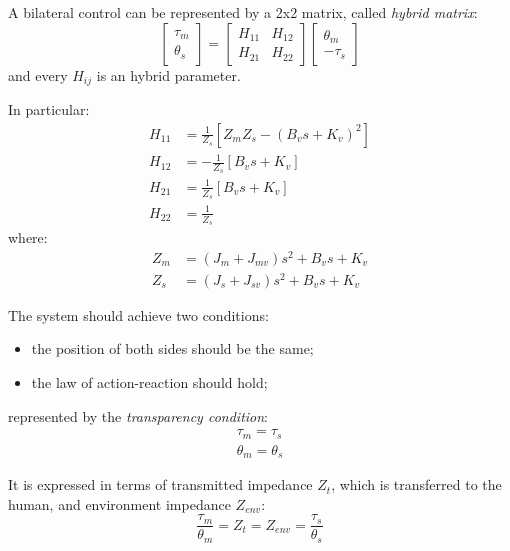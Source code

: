 A bilateral control can be represented by a 2x2 matrix, called \emph{hybrid matrix}:
\begin{equation}
	\begin{bmatrix}
	\tau_m \\ \theta_s
	\end{bmatrix} = 
	\begin{bmatrix}
	H_{11} & H_{12} \\
	H_{21} & H_{22}
	\end{bmatrix}
	\begin{bmatrix}
	\theta_m \\ - \tau_s
	\end{bmatrix}
	\label{hybrid_matrix}
\end{equation}
and every $ H_{ij} $ is an hybrid parameter.

In particular:
\begin{align}
	H_{11} &= \frac{1}{Z_s}[Z_m Z_s - (B_v s + K_v)^2] \\
	H_{12} &= -\frac{1}{Z_s}[B_v s + K_v] \\
	H_{21} &= \frac{1}{Z_s}[B_v s + K_v] \\
	H_{22} &= \frac{1}{Z_s} 
\end{align}
where:
\begin{align}
	Z_m &= (J_m + J_{mv}) s^2 + B_v s + K_v \\
	Z_s &= (J_s + J_{sv}) s^2 + B_v s + K_v
\end{align}

The system should achieve two conditions:
\begin{itemize}
	\item the position of both sides should be the same;
	\item the law of action-reaction should hold;
\end{itemize}
represented by the \emph{transparency condition}:
\begin{align}
	\tau_m = \tau_s \\
	\theta_m = \theta_s
\end{align}

It is expressed in terms of transmitted impedance $ Z_t $, which is transferred to the human, and environment impedance $ Z_{env} $:
\begin{equation}
	\frac{\tau_m}{\theta_m} = Z_t = Z_{env} = \frac{\tau_s}{\theta_s}
	\label{transparencY_condition}
\end{equation}

